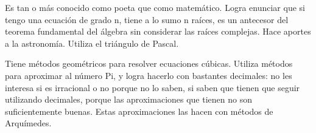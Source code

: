 Es tan o más conocido como poeta que como matemático. Logra enunciar que si tengo una ecuación de grado n, tiene a lo sumo n raíces, es un antecesor del teorema fundamental del álgebra sin considerar las raíces complejas. Hace aportes a la astronomía. Utiliza el triángulo de Pascal.

Tiene métodos geométricos para resolver ecuaciones cúbicas. Utiliza métodos para aproximar al número Pi, y logra hacerlo con bastantes decimales: no les interesa si es irracional o no porque no lo saben, si saben que tienen que seguir utilizando decimales, porque las aproximaciones que tienen no son suficientemente buenas. Estas aproximaciones las hacen con métodos de Arquímedes.
